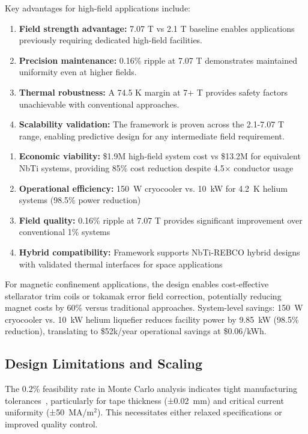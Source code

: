 \documentclass[10pt,twocolumn]{article}
\begin{document}
Key advantages for high-field applications include:
\begin{enumerate}
\item \textbf{Field strength advantage:} 7.07 T vs 2.1 T baseline enables applications previously requiring dedicated high-field facilities.
\item \textbf{Precision maintenance:} 0.16\% ripple at 7.07 T demonstrates maintained uniformity even at higher fields.
\item \textbf{Thermal robustness:} A 74.5 K margin at 7+ T provides safety factors unachievable with conventional approaches.
\item \textbf{Scalability validation:} The framework is proven across the 2.1-7.07 T range, enabling predictive design for any intermediate field requirement.
\end{enumerate}
\begin{enumerate}
\item \textbf{Economic viability:} \$1.9M high-field system cost vs \$13.2M for equivalent NbTi systems, providing 85\% cost reduction despite 4.5× conductor usage~\cite{IEEE_TAS_2015_cost}
\item \textbf{Operational efficiency:} 150~W cryocooler vs. 10~kW for 4.2~K helium systems (98.5\% power reduction)
\item \textbf{Field quality:} 0.16\% ripple at 7.07 T provides significant improvement over conventional 1\% systems
\item \textbf{Hybrid compatibility:} Framework supports NbTi-REBCO hybrid designs with validated thermal interfaces for space applications
\end{enumerate}

For magnetic confinement applications, the design enables cost-effective stellarator trim coils or tokamak error field correction, potentially reducing magnet costs by 60\% versus traditional approaches. System-level savings: 150~W cryocooler vs. 10~kW helium liquefier reduces facility power by 9.85~kW (98.5\% reduction), translating to \$52k/year operational savings at \$0.06/kWh.

\subsection{Design Limitations and Scaling}

The 0.2\% feasibility rate in Monte Carlo analysis indicates tight manufacturing tolerances~\cite{IEEE_TAS_2011_tolerances}, particularly for tape thickness (±0.02~mm) and critical current uniformity (±50~MA/m$^2$). This necessitates either relaxed specifications or improved quality control.
\end{document}
